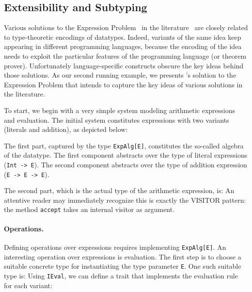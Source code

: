 \subsection{Extensibility and Subtyping}
\label{sec:extensibility}

Various solutions to the Expression Problem~\cite{wadler1998expression} in the
literature~\cite{finally-tagless,oliveira09modular,DelawareOS13,oliveira2012extensibility,
  swierstra:la-carte} are closely related to type-theoretic encodings of
datatypes. Indeed, variants of the same idea keep appearing in different
programming languages, because the encoding of the idea needs to exploit the
particular features of the programming language (or theorem prover).
Unfortunately language-specific constructs obscure the key ideas behind those
solutions. As our second running example, we presents \name's solution to the
Expression Problem that intends to capture the key ideas of various solutions in
the literature.

To start, we begin with a very simple system modeling arithmetic expressions and
evaluation. The initial system constitutes expressions with two variants
(literals and addition), as depicted below:

The first part, captured by the type \lstinline{ExpAlg[E]}, constitutes the
so-called algebra of the datatype. The first component abstracts over the type
of literal expressions (\lstinline{Int -> E}). The second component abstracts
over the type of addition expression (\lstinline{E -> E -> E}).

The second part, which is the actual type of the arithmetic expression, is:
An attentive reader may immediately recognize this is exactly the VISITOR
pattern: the method \lstinline{accept} takes an internal visitor as argument.



\paragraph{Operations.} Defining operations over expressions requires
implementing \lstinline{ExpAlg[E]}. An interesting operation over expressions is
evaluation. The first step is to choose a suitable concrete type for
instantiating the type parameter \lstinline{E}. One such suitable type is:
Using \lstinline{IEval}, we can define a trait that implements the evaluation
rule for each variant:


